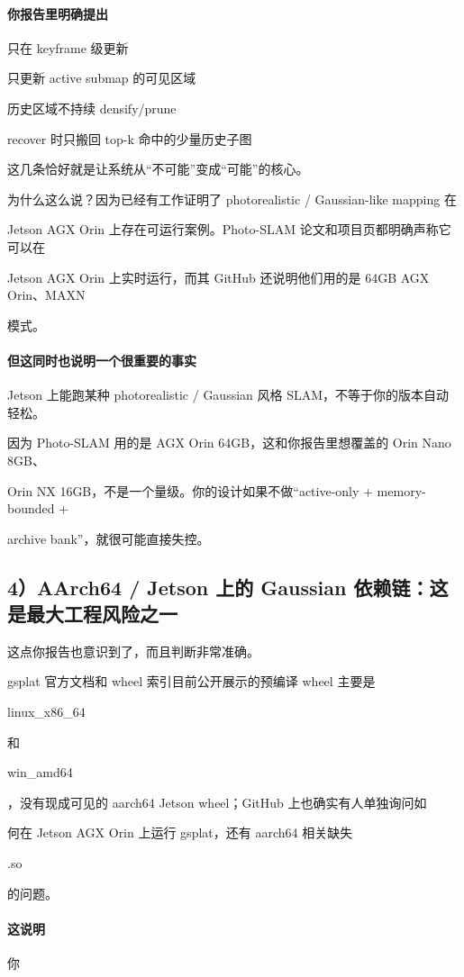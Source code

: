 \documentclass[12pt]{article}
\begin{document}
\paragraph{你报告里明确提出}
只在 keyframe 级更新

只更新 active submap 的可见区域

历史区域不持续 densify/prune

recover 时只搬回 top-k 命中的少量历史子图

这几条恰好就是让系统从“不可能”变成“可能”的核心。

为什么这么说？因为已经有工作证明了 photorealistic / Gaussian-like mapping 在

Jetson AGX Orin 上存在可运行案例。Photo-SLAM 论文和项目页都明确声称它可以在

Jetson AGX Orin 上实时运行，而其 GitHub 还说明他们用的是 64GB AGX Orin、MAXN

模式。

\paragraph{但这同时也说明一个很重要的事实}
Jetson 上能跑某种 photorealistic / Gaussian 风格 SLAM，不等于你的版本自动轻松。

因为 Photo-SLAM 用的是 AGX Orin 64GB，这和你报告里想覆盖的 Orin Nano 8GB、

Orin NX 16GB，不是一个量级。你的设计如果不做“active-only + memory-bounded +

archive bank”，就很可能直接失控。

\subsection{4）AArch64 / Jetson 上的 Gaussian 依赖链：这是最大工程风险之一}
这点你报告也意识到了，而且判断非常准确。

gsplat 官方文档和 wheel 索引目前公开展示的预编译 wheel 主要是

linux\_x86\_64

和

win\_amd64

，没有现成可见的 aarch64 Jetson wheel；GitHub 上也确实有人单独询问如

何在 Jetson AGX Orin 上运行 gsplat，还有 aarch64 相关缺失

.so

的问题。

\paragraph{这说明}
你
\end{document}
